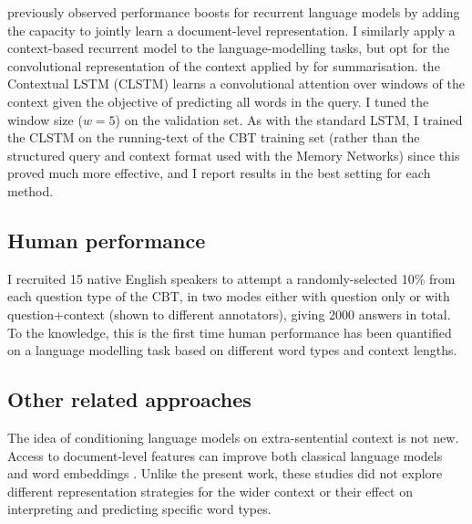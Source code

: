 \cite{mikolov2012context} previously observed performance boosts for recurrent language models by adding the capacity to jointly learn a document-level representation. I similarly apply a context-based recurrent model to the language-modelling tasks, but opt for the convolutional representation of the context applied by \cite{rush2015neural} for summarisation. the Contextual LSTM (CLSTM) learns a convolutional attention over windows of the context given the objective of predicting all words in the query. I tuned the window size (\(w=5\)) on the validation set. As with the standard LSTM, I trained the CLSTM on the running-text of the CBT training set (rather than the structured query and context format used with the Memory Networks) since this proved much more effective, and I  report results in the best setting for each method.

\subsection{Human performance}

I recruited 15 native English speakers to attempt a randomly-selected 10\% from each question type of the CBT, in two modes either with question only or with question+context (shown to different annotators), giving 2000 answers in total.
To the knowledge, this is the first time human performance has been quantified on a language modelling task based on %
different word types and context lengths.


\subsection{Other related approaches}
The idea of conditioning language models on extra-sentential context is not new. Access to document-level features can improve both classical language models \citep{mikolov2012context} and word embeddings \citep{huang2012improving}. Unlike the present work, these studies did not explore different representation strategies for the wider context or their effect on interpreting and predicting specific word types.

